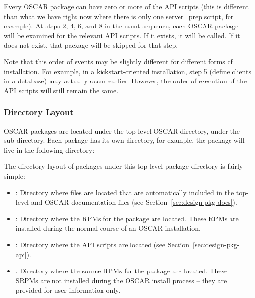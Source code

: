 Every OSCAR package can have zero or more of the API scripts (this is
different than what we have right now where there is only one
server\_prep script, for example).  At steps 2, 4, 6, and 8 in the
event sequence, each OSCAR package will be examined for the relevant
API scripts.  If it exists, it will be called.  If it does not exist,
that package will be skipped for that step.

Note that this order of events may be slightly different for different
forms of installation.  For example, in a kickstart-oriented
installation, step 5 (define clients in a database) may actually occur
earlier.  However, the order of execution of the API scripts will
still remain the same.

\endchange


\subsubsection{Directory Layout}

OSCAR packages are located under the top-level OSCAR directory, under
the  sub-directory.  Each package has its own
directory, for example, the  package will live in the
following directory:

\vspace{10pt}
\centerline{}
\vspace{10pt}

The directory layout of packages under this top-level package
directory is fairly simple:

\begin{itemize}
\item {}: Directory where files are located that are
  automatically included in the top-level  and
   OSCAR documentation files (see
  Section~\ref{sec:design-pkg-docs}).
  
\item {}: Directory where the RPMs for the package are
  located.  These RPMs are installed during the normal course of an
  OSCAR installation.

\item {}: Directory where the API scripts are located
  (see Section~\ref{sec:design-pkg-api}).
  
\item {}: Directory where the source RPMs for the
  package are located.  These SRPMs are not installed during the OSCAR
  install process -- they are provided for user information only.
\end{itemize}

